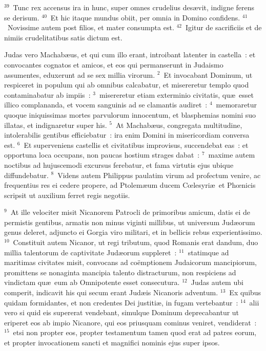 ${}^{39}$~Tunc rex accensus ira in hunc, super omnes crudelius des\ae vit, indigne ferens se derisum.
${}^{40}$~Et hic itaque mundus obiit, per omnia in Domino confidens.
${}^{41}$~Novissime autem post filios, et mater consumpta est.
${}^{42}$~Igitur de sacrificiis et de nimiis crudelitatibus satis dictum est.

\lettrine[lines=3,image=true,loversize=0.05,lraise=-0.03]{J}{}udas vero Machab\ae us, et qui cum illo erant, introibant latenter in castella~: et convocantes cognatos et amicos, et eos qui permanserunt in Judaismo assumentes, eduxerunt ad se sex millia virorum.
${}^{2}$~Et invocabant Dominum, ut respiceret in populum qui ab omnibus calcabatur, et misereretur templo quod contaminabatur ab impiis~:
${}^{3}$~misereretur etiam exterminio civitatis, qu\ae\ esset illico complananda, et vocem sanguinis ad se clamantis audiret~:
${}^{4}$~memoraretur quoque iniquissimas mortes parvulorum innocentum, et blasphemias nomini suo illatas, et indignaretur super his.
${}^{5}$~At Machab\ae us, congregata multitudine, intolerabilis gentibus efficiebatur~: ira enim Domini in misericordiam conversa est.
${}^{6}$~Et superveniens castellis et civitatibus improvisus, succendebat eas~: et opportuna loca occupans, non paucas hostium strages dabat~:
${}^{7}$~maxime autem noctibus ad hujuscemodi excursus ferebatur, et fama virtutis ejus ubique diffundebatur.
${}^{8}$~Videns autem Philippus paulatim virum ad profectum venire, ac frequentius res ei cedere propere, ad Ptolem\ae um ducem Cœlesyri\ae\ et Phœnicis scripsit ut auxilium ferret regis negotiis.


${}^{9}$~At ille velociter misit Nicanorem Patrocli de primoribus amicum, datis ei de permistis gentibus, armatis non minus viginti millibus, ut universum Jud\ae orum genus deleret, adjuncto ei Gorgia viro militari, et in bellicis rebus experientissimo.
${}^{10}$~Constituit autem Nicanor, ut regi tributum, quod Romanis erat dandum, duo millia talentorum de captivitate Jud\ae orum suppleret~:
${}^{11}$~statimque ad maritimas civitates misit, convocans ad co\"emptionem Judaicorum mancipiorum, promittens se nonaginta mancipia talento distracturum, non respiciens ad vindictam qu\ae\ eum ab Omnipotente esset consecutura.
${}^{12}$~Judas autem ubi comperit, indicavit his qui secum erant Jud\ae is Nicanoris adventum.
${}^{13}$~Ex quibus quidam formidantes, et non credentes Dei justiti\ae , in fugam vertebantur~:
${}^{14}$~alii vero si quid eis supererat vendebant, simulque Dominum deprecabantur ut eriperet eos ab impio Nicanore, qui eos priusquam cominus veniret, vendiderat~:
${}^{15}$~etsi non propter eos, propter testamentum tamen quod erat ad patres eorum, et propter invocationem sancti et magnifici nominis ejus super ipsos.


